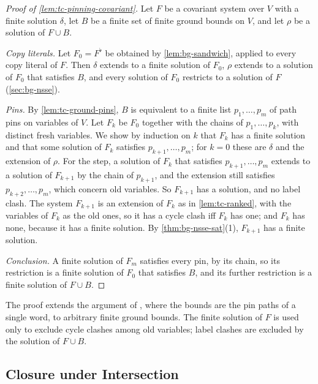 \begin{proof}[Proof of \cref{lem:tc-pinning-covariant}]
Let $F$ be a covariant system over $V$ with a finite solution $\delta$, let $B$
be a finite set of finite ground bounds on $V$, and let $\rho$ be a solution of
$F\cup B$.

\emph{Copy literals.} Let $F_0=F^\flat$ be obtained by \cref{lem:bg-sandwich},
applied to every copy literal of $F$. Then $\delta$ extends to a finite
solution of $F_0$, $\rho$ extends to a solution of $F_0$ that satisfies $B$,
and every solution of $F_0$ restricts to a solution of $F$
(\cref{sec:bg-nsse}).

\emph{Pins.} By \cref{lem:tc-ground-pins}, $B$ is equivalent to a finite list
$p_1,\ldots,p_m$ of path pins on variables of $V$. Let $F_k$ be $F_0$ together
with the chains of $p_1,\ldots,p_k$, with distinct fresh variables. We show by
induction on $k$ that $F_k$ has a finite solution and that some solution of
$F_k$ satisfies $p_{k+1},\ldots,p_m$; for $k=0$ these are $\delta$ and the
extension of $\rho$. For the step, a solution of $F_k$ that satisfies
$p_{k+1},\ldots,p_m$ extends to a solution of $F_{k+1}$ by the chain of
$p_{k+1}$, and the extension still satisfies $p_{k+2},\ldots,p_m$, which
concern old variables. So $F_{k+1}$ has a solution, and no label clash. The
system $F_{k+1}$ is an extension of $F_k$ as in \cref{lem:tc-ranked}, with the
variables of $F_k$ as the old ones, so it has a cycle clash iff $F_k$ has one;
and $F_k$ has none, because it has a finite solution. By
\cref{thm:bg-nsse-sat}(1), $F_{k+1}$ has a finite solution.

\emph{Conclusion.} A finite solution of $F_m$ satisfies every pin, by its
chain, so its restriction is a finite solution of $F_0$ that satisfies $B$, and
its further restriction is a finite solution of $F\cup B$.
\end{proof}

The proof extends the argument of
, where the bounds are the
pin paths of a single word, to arbitrary finite ground bounds. The finite solution
of $F$ is used only to exclude cycle clashes among old variables; label clashes
are excluded by the solution of $F\cup B$.

\subsection{Closure under Intersection}

